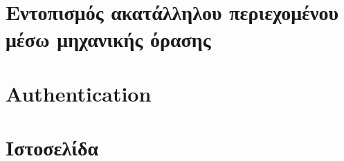 \documentclass[../thesis.tex]{subfiles}
\begin{document}
\section*{Εντοπισμός ακατάλληλου περιεχομένου μέσω μηχανικής όρασης}


\section*{Authentication}
\label{sec:authentication}


\section*{Ιστοσελίδα}
\label{sec:website}

\end{document}
